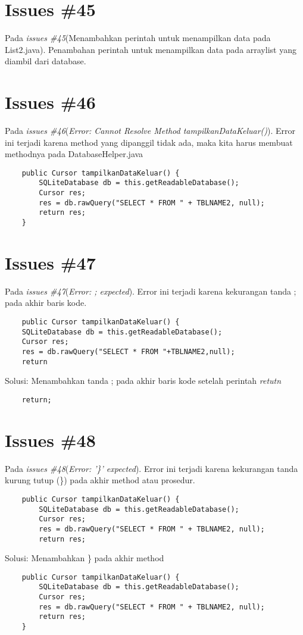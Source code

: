 \section{Issues \#45}
Pada \textit{issues \#45}(Menambahkan perintah untuk menampilkan data pada List2.java). Penambahan perintah untuk menampilkan data pada arraylist yang diambil dari database.

\section{Issues \#46}
Pada \textit{issues \#46}(\textit{Error: Cannot Resolve Method tampilkanDataKeluar()}). Error ini terjadi karena method yang dipanggil tidak ada, maka kita harus membuat methodnya pada DatabaseHelper.java
\begin{verbatim}
    public Cursor tampilkanDataKeluar() {
        SQLiteDatabase db = this.getReadableDatabase();
        Cursor res;
        res = db.rawQuery("SELECT * FROM " + TBLNAME2, null);
        return res;
    }
\end{verbatim}

\section{Issues \#47}
Pada \textit{issues \#47}(\textit{Error: ; expected}). Error ini terjadi karena kekurangan tanda ; pada akhir baris kode.
\begin{verbatim}
    public Cursor tampilkanDataKeluar() { 
    SQLiteDatabase db = this.getReadableDatabase();
    Cursor res;
    res = db.rawQuery("SELECT * FROM "+TBLNAME2,null);
    return 
\end{verbatim}
Solusi: Menambahkan tanda ; pada akhir baris kode setelah perintah \textit{retutn}
\begin{verbatim}
    return;
\end{verbatim}

\section{Issues \#48}
Pada \textit{issues \#48}(\textit{Error: '\}' expected}). Error ini terjadi karena kekurangan tanda kurung tutup (\}) pada akhir method atau prosedur.
\begin{verbatim}
    public Cursor tampilkanDataKeluar() {
        SQLiteDatabase db = this.getReadableDatabase();
        Cursor res;
        res = db.rawQuery("SELECT * FROM " + TBLNAME2, null);
        return res;
\end{verbatim}
Solusi: Menambahkan \} pada akhir method
\begin{verbatim}
    public Cursor tampilkanDataKeluar() {
        SQLiteDatabase db = this.getReadableDatabase();
        Cursor res;
        res = db.rawQuery("SELECT * FROM " + TBLNAME2, null);
        return res;
    }
\end{verbatim}

